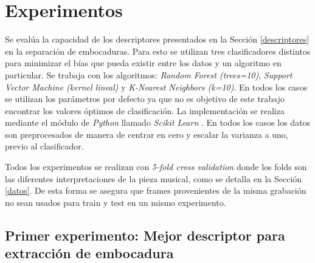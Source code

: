 \documentclass{article}
\begin{document}
%
%
%
%
%
   
\section{Experimentos}
\label{experimento}

Se evalúa la capacidad de los descriptores presentados en la Sección \ref{descriptores} en la separación de embocaduras. Para esto se utilizan tres clasificadores distintos para minimizar el bías que pueda existir entre los datos y un algoritmo en particular. Se trabaja con los algoritmos: \textit{Random Forest (trees=10)}, \textit{Support Vector Machine (kernel lineal)} y \textit{K-Nearest Neighbors (k=10)}. En todos los casos se utilizan los parámetros por defecto ya que no es objetivo de este trabajo encontrar los valores óptimos de clasificación. La implementación se realiza mediante el módulo de \textit{Python} llamado \textit{Scikit Learn} \citep{pedregosa2011scikit}. En todos los casos los datos son preprocesados de manera de centrar en cero y escalar la varianza a uno, previo al clasificador.
\medskip

Todos los experimentos se realizan con \textit{5-fold cross validation} donde los folds son las diferentes interpretaciones de la pieza musical, como se detalla en la Sección \ref{datos}. De esta forma se asegura que frames provenientes de la misma grabación no sean usados para train y test en un mismo experimento.
\medskip

\subsection{Primer experimento: Mejor descriptor para extracción de embocadura}
\label{experimento1}
\end{document}

